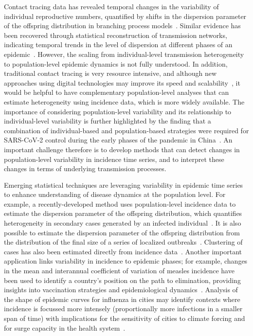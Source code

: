 \documentclass[11pt,letterpaper]{article}
\begin{document}
Contact tracing data has revealed temporal changes in the variability of individual reproductive numbers, quantified by shifts in the dispersion parameter of the offspring distribution in branching process models~\citep{guo2023statistical,ko2023time}. 
Similar evidence has been recovered through statistical reconstruction of transmission networks, indicating temporal trends in the level of dispersion at different phases of an epidemic~\citep{lau2017spatial}.
However, the scaling from individual-level transmission heterogeneity to population-level epidemic dynamics is not fully understood.
In addition, traditional contact tracing is very resource intensive, and although new approaches using digital technologies may improve its speed and scalability~\citep{kretzschmar2020impact}, it would be helpful to have complementary population-level analyses that can estimate heterogeneity using incidence data, which is more widely available.
The importance of considering population-level variability and its relationship to individual-level variability is further highlighted by the finding that a combination of individual-based and population-based strategies were required for SARS-CoV-2 control during the early phases of the pandemic in China~\citep{sun2021transmission}. 
An important challenge therefore is to develop methods that can detect changes in population-level variability in incidence time series, and to interpret these changes in terms of underlying transmission processes.

Emerging statistical techniques are leveraging variability in epidemic time series to enhance understanding of disease dynamics at the population level. 
For example, a recently-developed method uses population-level incidence data to estimate the dispersion parameter of the offspring distribution, which quantifies heterogeneity in secondary cases generated by an infected individual~\citep{kirkegaard2021superspreading}. 
It is also possible to estimate the dispersion parameter of the offspring distribution from the distribution of the final size of a series of localized outbreaks~\citep{blumberg2013inference}.
Clustering of cases has also been estimated directly from incidence data~\citep{schneckenreither2023assessing}.
Another important application links variability in incidence to epidemic phases; for example, changes in the mean and interannual coefficient of variation of measles incidence have been used to identify a country’s position on the path to elimination, providing insights into vaccination strategies and epidemiological dynamics~\citep{graham2019measles}. 
Analysis of the shape of epidemic curves for influenza in cities may identify contexts where incidence is focussed more intensely (proportionally more infections in a smaller span of time) with implications for the sensitivity of cities to climate forcing and for surge capacity in the health system~\citep{dalziel2018urbanization, wallinga2018metropolitan}. 
\end{document}
